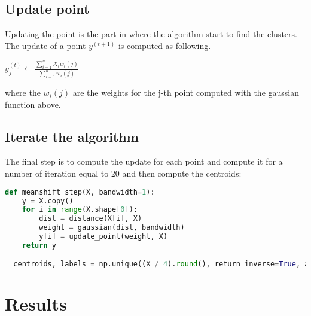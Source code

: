 \documentclass{ETHExercise}
\begin{document}
\subsection{Update point}
Updating the point is the part in where the algorithm start to find the clusters.
The update of a point $y^{(t+1)}$ is computed as following.

\begin{center}
  $y_j^{(t)} \leftarrow \frac{\sum\limits_{i=1}^{n}X_i w_i(j)}{\sum\limits_{i=1}^{n}w_i(j)}$
\end{center}

where the $w_i(j)$ are the weights for the j-th point computed with the gaussian function above.

\subsection{Iterate the algorithm}

The final step is to compute the update for each point and compute it for a number of iteration 
equal to 20 and then compute the centroids:

\begin{lstlisting}[language=Python, caption=Mean-shift]
  def meanshift_step(X, bandwidth=1):
    y = X.copy()
    for i in range(X.shape[0]):
        dist = distance(X[i], X)
        weight = gaussian(dist, bandwidth)
        y[i] = update_point(weight, X)
    return y

  centroids, labels = np.unique((X / 4).round(), return_inverse=True, axis=0)

\end{lstlisting}


\section{Results}
\end{document}

